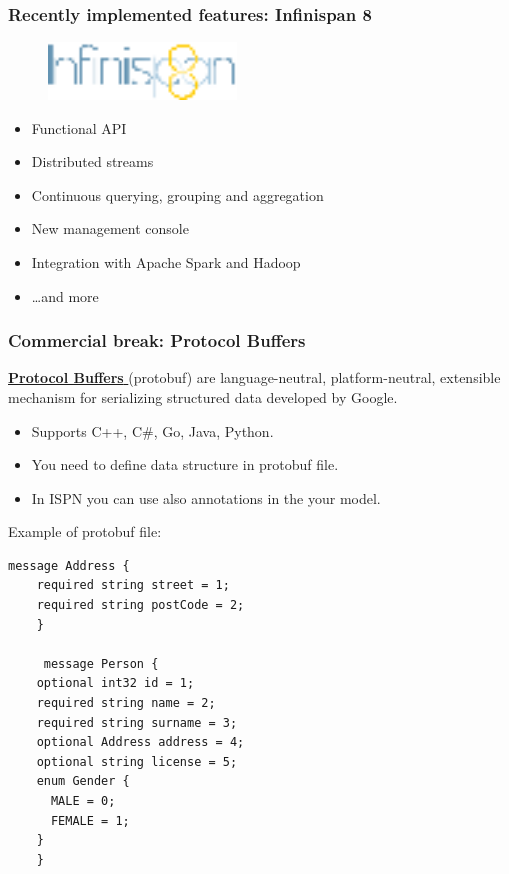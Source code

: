 \documentclass[10pt,utf8]{beamer}
\begin{document}
\begin{frame}
	\frametitle{Recently implemented features: Infinispan 8}
	\begin{figure}
		\centering
		\includegraphics[width=5cm]{./img/infinispan8.eps}
	\end{figure}
  \begin{itemize}
    \item Functional API
		\pause
		\item Distributed streams
		\pause
		\item Continuous querying, grouping and aggregation
		\pause
		\item New management console
		\pause
		\item Integration with Apache Spark and Hadoop
		\item \dots and more
  \end{itemize}
\end{frame}

\begin{frame}[fragile]
	\frametitle{Commercial break: Protocol Buffers}
	\href{https://developers.google.com/protocol-buffers/}{\color{blue}\textbf{Protocol Buffers }} (protobuf) are language-neutral, platform-neutral, extensible mechanism for serializing 
	structured data developed by Google. \\ 
	\vspace{0.1cm}
	
	\begin{itemize}
		\item Supports C++, C\#, Go, Java, Python.
		\item You need to define data structure in protobuf file.
		\item In ISPN you can use also annotations in the your model.
	\end{itemize}
	
	Example of protobuf file:
	\begin{lstlisting}[style=Protobuf] 
	message Address {
    required string street = 1;
    required string postCode = 2;
	}

	 message Person {
    optional int32 id = 1;
    required string name = 2;
    required string surname = 3;
    optional Address address = 4;
    optional string license = 5;
    enum Gender {
      MALE = 0;
      FEMALE = 1;
    }                                                                                                                                                                                                                                         
	}                
	\end{lstlisting}
\end{frame}
\end{document}
